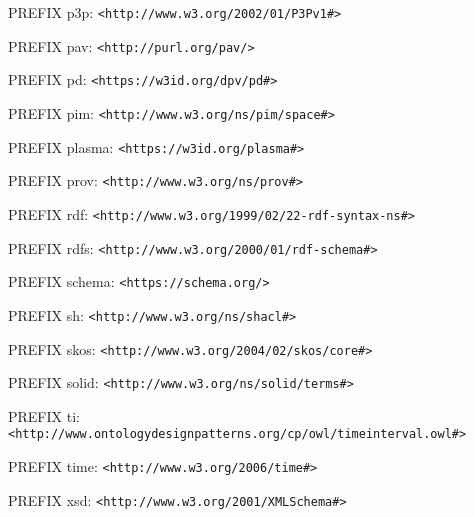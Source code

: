 \begin{footnotesize}
PREFIX p3p: \texttt{<http://www.w3.org/2002/01/P3Pv1\#>}

PREFIX pav: \texttt{<http://purl.org/pav/>}

PREFIX pd: \texttt{<https://w3id.org/dpv/pd\#>}

PREFIX pim: \texttt{<http://www.w3.org/ns/pim/space\#>}

PREFIX plasma: \texttt{<https://w3id.org/plasma\#>}

PREFIX prov: \texttt{<http://www.w3.org/ns/prov\#>}

PREFIX rdf: \texttt{<http://www.w3.org/1999/02/22-rdf-syntax-ns\#>}

PREFIX rdfs: \texttt{<http://www.w3.org/2000/01/rdf-schema\#>}

PREFIX schema: \texttt{<https://schema.org/>}

PREFIX sh: \texttt{<http://www.w3.org/ns/shacl\#>}

PREFIX skos: \texttt{<http://www.w3.org/2004/02/skos/core\#>}

PREFIX solid: \texttt{<http://www.w3.org/ns/solid/terms\#>}

PREFIX ti: \texttt{<http://www.ontologydesignpatterns.org/cp/owl/timeinterval.owl\#>}

PREFIX time: \texttt{<http://www.w3.org/2006/time\#>}

PREFIX xsd: \texttt{<http://www.w3.org/2001/XMLSchema\#>}
\end{footnotesize}
